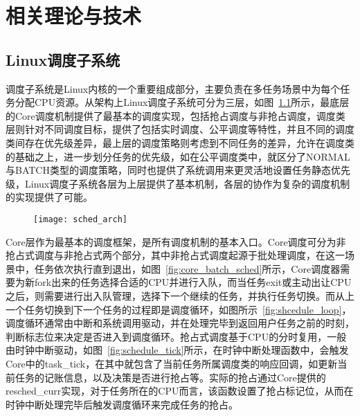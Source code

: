 \chapter{相关理论与技术}\label{chap:theories_tech}

\section{Linux调度子系统}


调度子系统是Linux内核的一个重要组成部分，主要负责在多任务场景中为每个任务分配CPU资源。从架构上Linux调度子系统可分为三层，如图~\ref{fig:sched_arch}所示，最底层的Core调度机制提供了最基本的调度实现，包括抢占调度与非抢占调度，调度类层则针对不同调度目标，提供了包括实时调度、公平调度等特性，并且不同的调度类间存在优先级差异，最上层的调度策略则考虑到不同任务的差异，允许在调度类的基础之上，进一步划分任务的优先级，如在公平调度类中，就区分了NORMAL与BATCH类型的调度策略，同时也提供了系统调用来更灵活地设置任务静态优先级，Linux调度子系统各层为上层提供了基本机制，各层的协作为复杂的调度机制的实现提供了可能。

\begin{figure}[!htbp]
    \centering
    \texttt{[image: sched\_arch]}
    \label{fig:sched_arch}
\end{figure}

Core层作为最基本的调度框架，是所有调度机制的基本入口。Core调度可分为非抢占式调度与非抢占式两个部分，其中非抢占式调度起源于批处理调度，在这一场景中，任务依次执行直到退出，如图~\ref{fig:core_batch_sched}所示，Core调度器需要为新fork出来的任务选择合适的CPU并进行入队，而当任务exit或主动出让CPU之后，则需要进行出入队管理，选择下一个继续的任务，并执行任务切换。而从上一个任务切换到下一个任务的过程即是调度循环，如图所示~\ref{fig:shcedule_loop}，调度循环通常由中断和系统调用驱动，并在处理完毕到返回用户任务之前的时刻，判断标志位来决定是否进入到调度循环。抢占式调度基于CPU的分时复用，一般由时钟中断驱动，如图~\ref{fig:schedule_tick}所示，在时钟中断处理函数中，会触发Core中的task\_tick，在其中就包含了当前任务所属调度类的响应回调，如更新当前任务的记账信息，以及决策是否进行抢占等。实际的抢占通过Core提供的resched\_curr实现，对于任务所在的CPU而言，该函数设置了抢占标记位，从而在时钟中断处理完毕后触发调度循环来完成任务的抢占。

